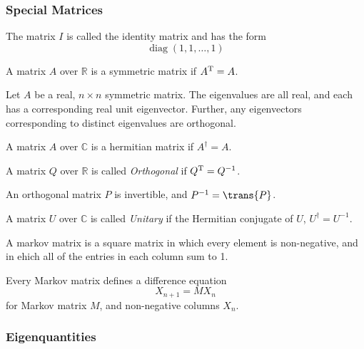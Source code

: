 \subsubsection{Special Matrices}
\label{sec:special}

\begin{definition}
  The matrix $I$ is called the identity matrix and has the form 
  \[ \operatorname{diag}(1,1,\dots, 1) \]
\end{definition}
\begin{definition}
  A matrix $A$ over $\mathbb{R}$ is a symmetric matrix if $A^{\rm T} = A$.
\end{definition}
\begin{lemma}
  Let $A$ be a real, $n \times n$ symmetric matrix. The eigenvalues
  are all real, and each has a corresponding real unit
  eigenvector. Further, any eigenvectors corresponding to distinct
  eigenvalues are orthogonal.
\end{lemma}
\begin{definition}
  A matrix $A$ over $\mathbb{C}$ is a hermitian matrix if $A^\dagger = A$.
\end{definition}
\begin{definition}
  A matrix $Q$ over $\mathbb{R}$ is called \emph{Orthogonal} if
  $Q^{\rm T} = Q^{-1}$.
\end{definition}
\begin{lemma}
  An orthogonal matrix $P$ is invertible, and $P^{-1} = \trans{P}$.
\end{lemma}
\begin{definition}
  A matrix $U$ over $\mathbb{C}$ is called \emph{Unitary} if the
  Hermitian conjugate of $U$, $U^{\dagger} = U^{-1}$.
\end{definition}
\begin{definition}
  A markov matrix is a square matrix in which every element is
  non-negative, and in ehich all of the entries in each column sum to
  1.
\end{definition}
Every Markov matrix defines a difference equation \[ X_{n+1} = M
X_n \] for Markov matrix $M$, and non-negative columns $X_n$.
\subsubsection{Eigenquantities}
\label{sec:eigen}

